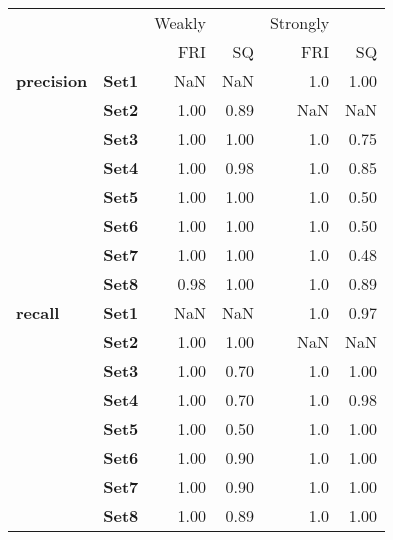 \begin{tabular}{llrrrr}
\toprule
       &      & Weakly &       & Strongly &       \\
       &      &    FRI &    SQ &      FRI &    SQ \\
\midrule
\textbf{precision} & \textbf{Set1} &    NaN &   NaN &      1.0 &  1.00 \\
       & \textbf{Set2} &   1.00 &  0.89 &      NaN &   NaN \\
       & \textbf{Set3} &   1.00 &  1.00 &      1.0 &  0.75 \\
       & \textbf{Set4} &   1.00 &  0.98 &      1.0 &  0.85 \\
       & \textbf{Set5} &   1.00 &  1.00 &      1.0 &  0.50 \\
       & \textbf{Set6} &   1.00 &  1.00 &      1.0 &  0.50 \\
       & \textbf{Set7} &   1.00 &  1.00 &      1.0 &  0.48 \\
       & \textbf{Set8} &   0.98 &  1.00 &      1.0 &  0.89 \\
\textbf{recall} & \textbf{Set1} &    NaN &   NaN &      1.0 &  0.97 \\
       & \textbf{Set2} &   1.00 &  1.00 &      NaN &   NaN \\
       & \textbf{Set3} &   1.00 &  0.70 &      1.0 &  1.00 \\
       & \textbf{Set4} &   1.00 &  0.70 &      1.0 &  0.98 \\
       & \textbf{Set5} &   1.00 &  0.50 &      1.0 &  1.00 \\
       & \textbf{Set6} &   1.00 &  0.90 &      1.0 &  1.00 \\
       & \textbf{Set7} &   1.00 &  0.90 &      1.0 &  1.00 \\
       & \textbf{Set8} &   1.00 &  0.89 &      1.0 &  1.00 \\
\bottomrule
\end{tabular}
